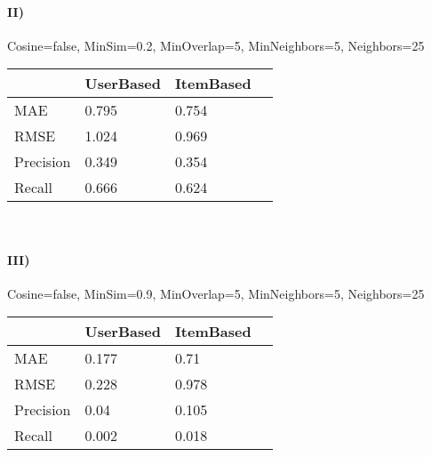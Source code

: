 \documentclass{article}
\begin{document}
\paragraph{II)}
Cosine=false, MinSim=0.2, MinOverlap=5, MinNeighbors=5, Neighbors=25\\
\begin{tabular}{| l | l | l | l |}
  \hline          
& UserBased & ItemBased  \\\hline
MAE & 0.795 & 0.754 \\
RMSE & 1.024 & 0.969 \\
Precision & 0.349 & 0.354 \\
Recall & 0.666 & 0.624 \\
  \hline  
\end{tabular}
\vspace{1cm}\\
\paragraph{III)}
Cosine=false, MinSim=0.9, MinOverlap=5, MinNeighbors=5, Neighbors=25\\
\begin{tabular}{| l | l | l | l |}
  \hline          
& UserBased & ItemBased  \\\hline
MAE & 0.177 & 0.71 \\
RMSE & 0.228 & 0.978 \\
Precision & 0.04 & 0.105 \\
Recall & 0.002 & 0.018 \\
  \hline  
\end{tabular}
\end{document}
